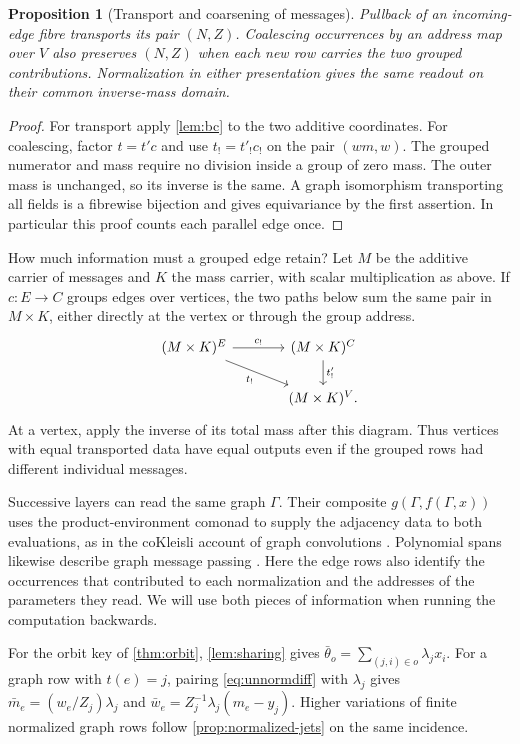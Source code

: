 \documentclass[11pt,a4paper]{article}
\newtheorem{proposition}[proposition]{Proposition}
\theoremstyle{definition}
\theoremstyle{remark}\newaliascnt{remark}{theorem}
\numberwithin{equation}{section}
\begin{document}
\begin{proposition}[Transport and coarsening of messages]\label{thm:graph}
Pullback of an incoming-edge fibre transports its pair $(N,Z)$. Coalescing occurrences by an address map over $V$ also preserves $(N,Z)$ when each new row carries the two grouped contributions. Normalization in either presentation gives the same readout on their common inverse-mass domain.
\end{proposition}
\begin{proof}
For transport apply \cref{lem:bc} to the two additive coordinates. For coalescing, factor $t=t'c$ and use $t_!=t'_!c_!$ on the pair $(wm,w)$. The grouped numerator and mass require no division inside a group of zero mass. The outer mass is unchanged, so its inverse is the same. A graph isomorphism transporting all fields is a fibrewise bijection and gives equivariance by the first assertion. In particular this proof counts each parallel edge once.
\end{proof}
How much information must a grouped edge retain? Let $M$ be the additive carrier of messages and $K$ the mass carrier, with scalar multiplication as above. If $c:E\to C$ groups edges over vertices, the two paths below sum the same pair in $M\times K$, either directly at the vertex or through the group address.
\[
\begin{tikzcd}[column sep=large]
 (M\times K)^E\arrow[r,"c_!"]\arrow[dr,"t_!"']&
 (M\times K)^C\arrow[d,"t'_!"]\\
 &(M\times K)^V .
\end{tikzcd}
\]
At a vertex, apply the inverse of its total mass after this diagram. Thus vertices with equal transported data have equal outputs even if the grouped rows had different individual messages.

Successive layers can read the same graph $\Gamma$. Their composite $g(\Gamma,f(\Gamma,x))$ uses the product-environment comonad to supply the adjacency data to both evaluations, as in the coKleisli account of graph convolutions \cite{graph:cokleisli}. Polynomial spans likewise describe graph message passing \cite{graph:dp}. Here the edge rows also identify the occurrences that contributed to each normalization and the addresses of the parameters they read. We will use both pieces of information when running the computation backwards.

For the orbit key of \cref{thm:orbit}, \cref{lem:sharing} gives $\bar\theta_o=\sum_{(j,i)\in o}\lambda_j x_i$. For a graph row with $t(e)=j$, pairing \cref{eq:unnormdiff} with $\lambda_j$ gives $\bar m_e=(w_e/Z_j)\lambda_j$ and $\bar w_e=Z_j^{-1}\lambda_j(m_e-y_j)$. Higher variations of finite normalized graph rows follow \cref{prop:normalized-jets} on the same incidence.
\end{document}
